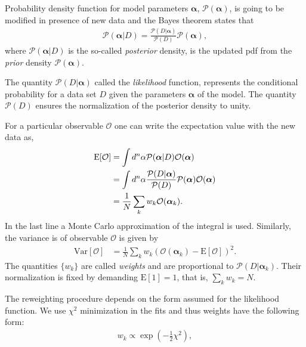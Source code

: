 \documentclass[twocolumn,showpacs,preprintnumbers,amsmath,amssymb,floatfix,prd]{revtex4}
\begin{document}
Probability density function for model parameters $\bm{\alpha}$, $\mathcal{P}(\bm{\alpha})$, is going to be modified in presence of new data and the Bayes theorem states that 
%
\begin{align}
\mathcal{P}(\bm{\alpha}|D)
=\frac{\mathcal{P}(D|\bm{\alpha})}{\mathcal{P}(D)} \mathcal{P}(\bm{\alpha}),
\label{eq:bayes}
\end{align}
%
where $\mathcal{P}(\bm{\alpha}|D)$ is the so-called \emph{posterior} density, 
is the updated pdf from the \emph{prior} density 
$\mathcal{P}(\bm{\alpha})$.
 
The quantity $\mathcal{P}(D|\bm{\alpha})$ called the \emph{likelihood} 
function,
represents the conditional probability for a data set $D$ given the
parameters $\bm{\alpha}$ of the model.
The quantity $\mathcal{P}(D) $ ensures the normalization of the 
posterior density to unity.  

For a particular observable $\mathcal{O}$ one can write the expectation value 
with the new data as,
%
\begin{align}
\text{E}[\mathcal{O}]
&=	\int d^n\alpha \mathcal{P}(\bm{\alpha}|D)
	\mathcal{O}(\bm{\alpha})\notag\\
&=	\int d^n\alpha \frac{\mathcal{P}(D|\bm{\alpha})}{\mathcal{P}(D)} 
	\mathcal{P}(\bm{\alpha})\mathcal{O}(\bm{\alpha})\notag\\
&=	\frac{1}{N} \sum_k w_k \mathcal{O}(\bm{\alpha}_k).
\label{eq:E}
\end{align}
%
In the last line  a Monte Carlo approximation of the integral is used.
Similarly, the variance is of observable $\mathcal{O}$ is given by
%
\begin{align}
\text{Var}[\mathcal{O}]
&=\frac{1}{N} \sum_k w_k (\mathcal{O}(\bm{\alpha}_k)-\text{E}
[\mathcal{O}])^2 .
\label{eq:Var}
\end{align}
%
The quantities $\{w_k\}$ are called \emph{weights} and are proportional to 
$\mathcal{P}(D|\bm{\alpha}_k)$. 
Their normalization is fixed by demanding $\text{E}[1]=1$, that is,  
$\sum_k w_k=N$.

The reweighting procedure depends on the form assumed for the likelihood 
function. We use $\chi^2$ minimization in the fits and thus weights have the following form:
\begin{align}
	w_k \propto \exp\left(-\frac{1}{2}\chi^2\right),
\label{eq:bayes1}
\end{align}



\end{document}

